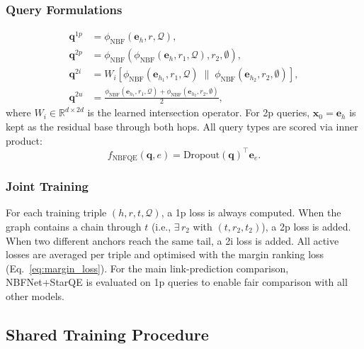 \documentclass[10pt,journal,compsoc]{IEEEtran}
\begin{document}
\subsubsection{Query Formulations}
\begin{align}
  \mathbf{q}^{1p}
  &= \phi_{\mathrm{NBF}}(\mathbf{e}_h, r, \mathcal{Q}),
  \label{eq:nbfqe_1p} \\
  \mathbf{q}^{2p}
  &= \phi_{\mathrm{NBF}}\!\left(
       \phi_{\mathrm{NBF}}(\mathbf{e}_h, r_1, \mathcal{Q}),
       r_2, \emptyset
     \right),
  \label{eq:nbfqe_2p} \\
  \mathbf{q}^{2i}
  &= W_i\!\left[
       \phi_{\mathrm{NBF}}(\mathbf{e}_{h_1}, r_1, \mathcal{Q})
       \;\|\;
       \phi_{\mathrm{NBF}}(\mathbf{e}_{h_2}, r_2, \emptyset)
     \right],
  \label{eq:nbfqe_2i} \\
  \mathbf{q}^{2u}
  &= \frac{
       \phi_{\mathrm{NBF}}(\mathbf{e}_{h_1}, r_1, \mathcal{Q})
       + \phi_{\mathrm{NBF}}(\mathbf{e}_{h_2}, r_2, \emptyset)
     }{2},
  \label{eq:nbfqe_2u}
\end{align}
where $W_i \in \mathbb{R}^{d \times 2d}$ is the learned
intersection operator.
For 2p queries, $\mathbf{x}_0 = \mathbf{e}_h$ is kept
as the residual base through both hops.
All query types are scored via inner product:
\begin{equation}
  f_{\mathrm{NBFQE}}(\mathbf{q}, e)
  = \mathrm{Dropout}(\mathbf{q})^{\top} \mathbf{e}_e.
  \label{eq:nbfqe_score}
\end{equation}

\subsubsection{Joint Training}
For each training triple $(h, r, t, \mathcal{Q})$,
a 1p loss is always computed.
When the graph contains a chain through $t$
(i.e., $\exists\, r_2$ with $(t, r_2, t_2)$),
a 2p loss is added.
When two different anchors reach the same tail, a 2i loss is
added.
All active losses are averaged per triple and optimised with
the margin ranking loss (Eq.~\ref{eq:margin_loss}).
For the main link-prediction comparison, NBFNet+StarQE is
evaluated on 1p queries to enable fair comparison with
all other models.

\subsection{Shared Training Procedure}
\label{ssec:training}
\end{document}
